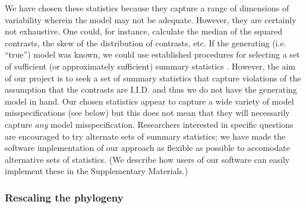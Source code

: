 \documentclass[12pt]{article}
\begin{document}
We have chosen these statistics because they capture a range of dimensions of variability wherein the model may not be adequate. However, they are certainly not exhaustive. One could, for instance, calculate the median of the squared contrasts, the skew of the distribution of contrasts, etc. If the generating (i.e. ``true'') model was known, we could use established procedures for selecting a set of sufficient (or approximately sufficient) summary statistics \citep[e.g.][]{MajoramJoyce, Wegmann2010}. However, the aim of our project is to seek a set of summary statistics that capture violations of the assumption that the contrasts are I.I.D. and thus we do not have the generating model in hand. Our chosen statistics appear to capture a wide variety of model misspecifications (see below) but this does not mean that they will necessarily capture \textit{any} model misspecification. Researchers interested in specific questions are encouraged to try alternate sets of summary statistics; we have made the software implementation of our approach as flexible as possible to accomodate alternative sets of statistics. (We describe how users of our software can easily implement these in the Supplementary Materials.)

\subsubsection{Rescaling the phylogeny}
\end{document}

